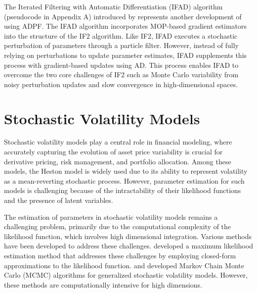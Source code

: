 \documentclass[11pt]{report}
\begin{document}
The Iterated Filtering with Automatic Differentiation (IFAD) algorithm (pseudocode in Appendix A) introduced by \citet{tan2024accelerated} represents another development of using ADPF. The IFAD algorithm incorporates MOP-based gradient estimators into the structure of the IF2 algorithm. Like IF2, IFAD executes a stochastic perturbation of parameters through a particle filter. However, instead of fully relying on perturbations to update parameter estimates, IFAD supplements this process with gradient-based updates using AD. This process enables IFAD to overcome the two core challenges of IF2 such as Monte Carlo variability from noisy perturbation updates and slow convergence in high-dimensional spaces.

\section{Stochastic Volatility Models}
Stochastic volatility models play a central role in financial modeling, where accurately capturing the evolution of asset price variability is crucial for derivative pricing, risk management, and portfolio allocation. Among these models, the Heston model is widely used due to its ability to represent volatility as a mean-reverting stochastic process. However, parameter estimation for such models is challenging because of the intractability of their likelihood functions and the presence of latent variables.

The estimation of parameters in stochastic volatility models remains a challenging problem, primarily due to the computational complexity of the likelihood function, which involves high dimensional integration. Various methods have been developed to address these challenges. \citet{ait2007maximum} developed a maximum likelihood estimation method that addresses these challenges by employing closed-form approximations to the likelihood function. \citet{chib2002markov} and \citet{chib2006analysis} developed Markov Chain Monte Carlo (MCMC) algorithms for generalized stochastic volatility models. However, these methods are computationally intensive for high dimensions.

\end{document}
